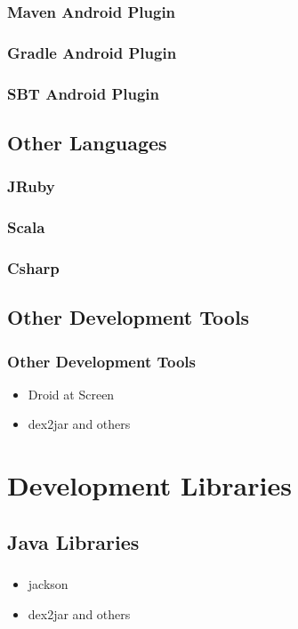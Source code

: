 \documentclass{beamer}
\begin{document}
\begin{frame}
  \frametitle{Maven Android Plugin}
\end{frame}

\begin{frame}
  \frametitle{Gradle Android Plugin}
\end{frame}

\begin{frame}
  \frametitle{SBT Android Plugin}
\end{frame}

\subsection{Other Languages}
\begin{frame}
  \frametitle{JRuby}
\end{frame}

\begin{frame}
  \frametitle{Scala}
\end{frame}

\begin{frame}
  \frametitle{Csharp}
\end{frame}

\subsection{Other Development Tools}

\begin{frame}
  \frametitle{Other Development Tools}
  \begin{itemize}
    \item<1->Droid at Screen 
    \item<2->dex2jar and others
  \end{itemize}
\end{frame}

\section{Development Libraries}
\subsection{Java Libraries}

\begin{frame}
  \frametitle{}
  \begin{itemize}
    \item<1->jackson
    \item<2->dex2jar and others
  \end{itemize}
\end{frame}
\end{document}
